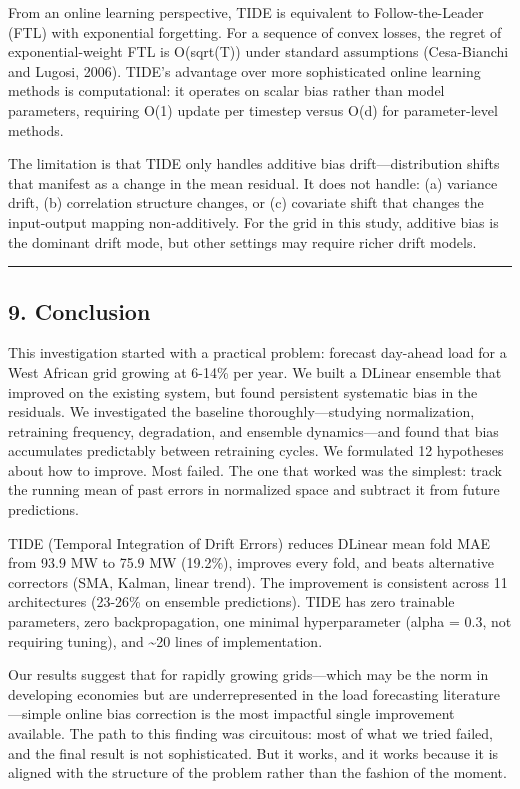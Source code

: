From an online learning perspective, TIDE is equivalent to
Follow-the-Leader (FTL) with exponential forgetting. For a sequence of
convex losses, the regret of exponential-weight FTL is O(sqrt(T)) under
standard assumptions (Cesa-Bianchi and Lugosi, 2006). TIDE's advantage
over more sophisticated online learning methods is computational: it
operates on scalar bias rather than model parameters, requiring O(1)
update per timestep versus O(d) for parameter-level methods.

The limitation is that TIDE only handles additive bias
drift---distribution shifts that manifest as a change in the mean
residual. It does not handle: (a) variance drift, (b) correlation
structure changes, or (c) covariate shift that changes the input-output
mapping non-additively. For the grid in this study, additive bias is the
dominant drift mode, but other settings may require richer drift models.

\begin{center}\rule{0.5\linewidth}{0.5pt}\end{center}

\subsection{9. Conclusion}\label{conclusion}

This investigation started with a practical problem: forecast day-ahead
load for a West African grid growing at 6-14\% per year. We built a
DLinear ensemble that improved on the existing system, but found
persistent systematic bias in the residuals. We investigated the
baseline thoroughly---studying normalization, retraining frequency,
degradation, and ensemble dynamics---and found that bias accumulates
predictably between retraining cycles. We formulated 12 hypotheses about
how to improve. Most failed. The one that worked was the simplest: track
the running mean of past errors in normalized space and subtract it from
future predictions.

TIDE (Temporal Integration of Drift Errors) reduces DLinear mean fold
MAE from 93.9 MW to 75.9 MW (19.2\%), improves every fold, and beats
alternative correctors (SMA, Kalman, linear trend). The improvement is
consistent across 11 architectures (23-26\% on ensemble predictions).
TIDE has zero trainable parameters, zero backpropagation, one minimal
hyperparameter (alpha = 0.3, not requiring tuning), and
\textasciitilde20 lines of implementation.

Our results suggest that for rapidly growing grids---which may be the
norm in developing economies but are underrepresented in the load
forecasting literature---simple online bias correction is the most
impactful single improvement available. The path to this finding was
circuitous: most of what we tried failed, and the final result is not
sophisticated. But it works, and it works because it is aligned with the
structure of the problem rather than the fashion of the moment.

